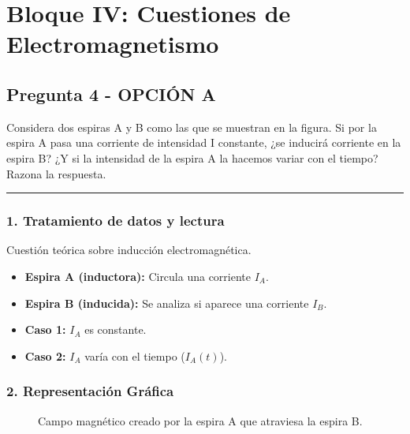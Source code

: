 \newpage

\section{Bloque IV: Cuestiones de Electromagnetismo}
\label{sec:em_2002_sep_ext}

\subsection{Pregunta 4 - OPCIÓN A}
\label{subsec:4A_2002_sep_ext}

\begin{cajaenunciado}
Considera dos espiras A y B como las que se muestran en la figura. Si por la espira A pasa una corriente de intensidad I constante, ¿se inducirá corriente en la espira B? ¿Y si la intensidad de la espira A la hacemos variar con el tiempo? Razona la respuesta.
\end{cajaenunciado}
\hrule

\subsubsection*{1. Tratamiento de datos y lectura}
Cuestión teórica sobre inducción electromagnética.
\begin{itemize}
    \item \textbf{Espira A (inductora):} Circula una corriente $I_A$.
    \item \textbf{Espira B (inducida):} Se analiza si aparece una corriente $I_B$.
    \item \textbf{Caso 1:} $I_A$ es constante.
    \item \textbf{Caso 2:} $I_A$ varía con el tiempo ($I_A(t)$).
\end{itemize}

\subsubsection*{2. Representación Gráfica}
\begin{figure}[H]
    \centering
    \caption{Campo magnético creado por la espira A que atraviesa la espira B.}
\end{figure}

